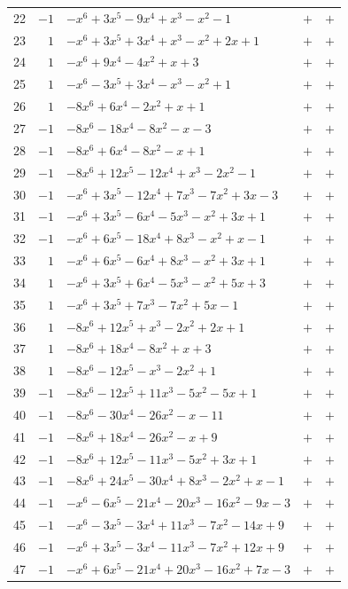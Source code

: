 \documentclass[11pt]{article}
\begin{document}
\begin{longtable}{@{}rrlcc@{}}
22 & $-1$ & $-x^{6}+3x^{5}-9x^{4}+x^{3}-x^{2}-1$ & $+$ & $+$\\
23 & $1$ & $-x^{6}+3x^{5}+3x^{4}+x^{3}-x^{2}+2x+1$ & $+$ & $+$\\
24 & $1$ & $-x^{6}+9x^{4}-4x^{2}+x+3$ & $+$ & $+$\\
25 & $1$ & $-x^{6}-3x^{5}+3x^{4}-x^{3}-x^{2}+1$ & $+$ & $+$\\
26 & $1$ & $-8x^{6}+6x^{4}-2x^{2}+x+1$ & $+$ & $+$\\
27 & $-1$ & $-8x^{6}-18x^{4}-8x^{2}-x-3$ & $+$ & $+$\\
28 & $-1$ & $-8x^{6}+6x^{4}-8x^{2}-x+1$ & $+$ & $+$\\
29 & $-1$ & $-8x^{6}+12x^{5}-12x^{4}+x^{3}-2x^{2}-1$ & $+$ & $+$\\
30 & $-1$ & $-x^{6}+3x^{5}-12x^{4}+7x^{3}-7x^{2}+3x-3$ & $+$ & $+$\\
31 & $-1$ & $-x^{6}+3x^{5}-6x^{4}-5x^{3}-x^{2}+3x+1$ & $+$ & $+$\\
32 & $-1$ & $-x^{6}+6x^{5}-18x^{4}+8x^{3}-x^{2}+x-1$ & $+$ & $+$\\
33 & $1$ & $-x^{6}+6x^{5}-6x^{4}+8x^{3}-x^{2}+3x+1$ & $+$ & $+$\\
34 & $1$ & $-x^{6}+3x^{5}+6x^{4}-5x^{3}-x^{2}+5x+3$ & $+$ & $+$\\
35 & $1$ & $-x^{6}+3x^{5}+7x^{3}-7x^{2}+5x-1$ & $+$ & $+$\\
36 & $1$ & $-8x^{6}+12x^{5}+x^{3}-2x^{2}+2x+1$ & $+$ & $+$\\
37 & $1$ & $-8x^{6}+18x^{4}-8x^{2}+x+3$ & $+$ & $+$\\
38 & $1$ & $-8x^{6}-12x^{5}-x^{3}-2x^{2}+1$ & $+$ & $+$\\
39 & $-1$ & $-8x^{6}-12x^{5}+11x^{3}-5x^{2}-5x+1$ & $+$ & $+$\\
40 & $-1$ & $-8x^{6}-30x^{4}-26x^{2}-x-11$ & $+$ & $+$\\
41 & $-1$ & $-8x^{6}+18x^{4}-26x^{2}-x+9$ & $+$ & $+$\\
42 & $-1$ & $-8x^{6}+12x^{5}-11x^{3}-5x^{2}+3x+1$ & $+$ & $+$\\
43 & $-1$ & $-8x^{6}+24x^{5}-30x^{4}+8x^{3}-2x^{2}+x-1$ & $+$ & $+$\\
44 & $-1$ & $-x^{6}-6x^{5}-21x^{4}-20x^{3}-16x^{2}-9x-3$ & $+$ & $+$\\
45 & $-1$ & $-x^{6}-3x^{5}-3x^{4}+11x^{3}-7x^{2}-14x+9$ & $+$ & $+$\\
46 & $-1$ & $-x^{6}+3x^{5}-3x^{4}-11x^{3}-7x^{2}+12x+9$ & $+$ & $+$\\
47 & $-1$ & $-x^{6}+6x^{5}-21x^{4}+20x^{3}-16x^{2}+7x-3$ & $+$ & $+$\\

\end{longtable}
\end{document}
